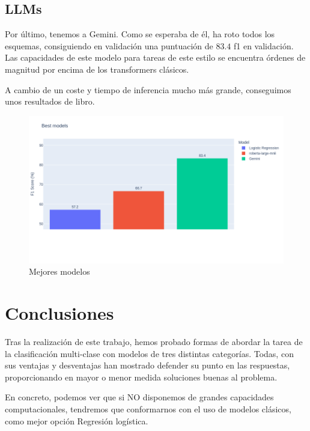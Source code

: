 \documentclass[11pt,spanish,listoffigures,listoftables]{tfgetsinf}
\begin{document}
\section{LLMs}
Por último, tenemos a Gemini. Como se esperaba de él, ha roto todos los esquemas, consiguiendo en validación una puntuación de $83.4$ f1 en validación. Las capacidades de este modelo para tareas de este estilo se encuentra órdenes de magnitud por encima de los transformers clásicos. 

A cambio de un coste y tiempo de inferencia mucho más grande, conseguimos unos resultados de libro.

\begin{figure}[H]
    \centering
    \includegraphics[width=1.0\linewidth]{images/F1-mejores.png}
    \caption{Mejores modelos}
    \label{fig:mores_modelos-f1-score}
\end{figure}

\chapter{Conclusiones}
Tras la realización de este trabajo, hemos probado formas de abordar la tarea de la clasificación multi-clase con modelos de tres distintas categorías. Todas, con sus ventajas y desventajas han mostrado defender su punto en las respuestas, proporcionando en mayor o menor medida soluciones buenas al problema.

En concreto, podemos ver que si NO disponemos de grandes capacidades computacionales, tendremos que conformarnos con el uso de modelos clásicos, como mejor opción Regresión logística. 
\end{document}
